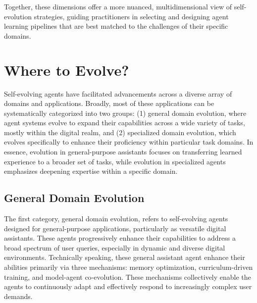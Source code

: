 \documentclass[10pt]{article} %
\begin{document}
Together, these dimensions offer a more nuanced, multidimensional view of self-evolution strategies, guiding practitioners in selecting and designing agent learning pipelines that are best matched to the challenges of their specific domains.



\section{Where to Evolve?}
\label{sec:applications}

Self-evolving agents have facilitated advancements across a diverse array of domains and applications. 
Broadly, most of these applications can be systematically categorized into two groups: 
(1) general domain evolution, where agent systems evolve to expand their capabilities across a wide variety of tasks, mostly within the digital realm, and 
(2) specialized domain evolution, which evolves specifically to enhance their proficiency within particular task domains. 
In essence, evolution in general-purpose assistants focuses on transferring learned experience to a broader set of tasks, while evolution in specialized agents emphasizes deepening expertise within a specific domain.


\subsection{General Domain Evolution}

The first category, general domain evolution, refers to self-evolving agents designed for general-purpose applications, particularly as versatile digital assistants. These agents progressively enhance their capabilities to address a broad spectrum of user queries, especially in dynamic and diverse digital environments.
Technically speaking, these general assistant agent enhance their abilities primarily via three mechanisms: 
memory optimization, curriculum-driven training, and model-agent co‑evolution. 
These mechanisms collectively enable the agents to continuously adapt and effectively respond to increasingly complex user demands. 
\end{document}
